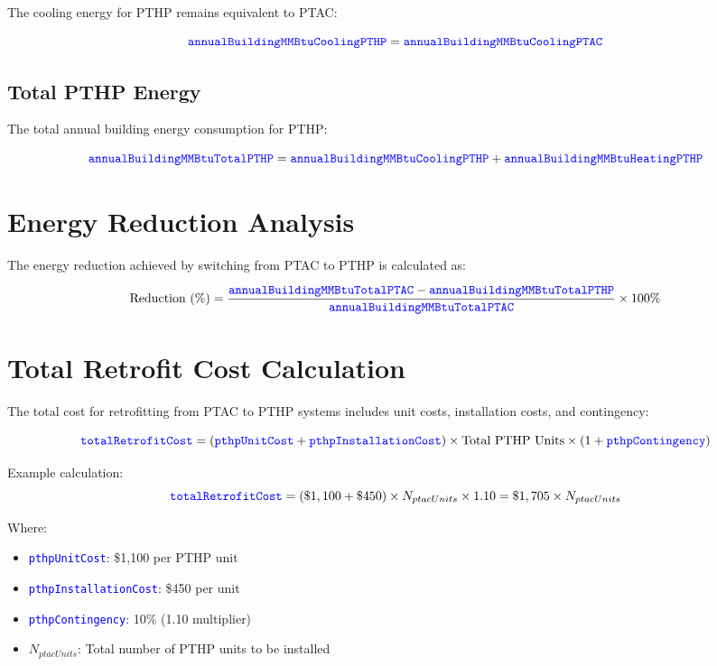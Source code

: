 \documentclass{article}
\newcommand{\code}[1]{\textcolor{blue}{\texttt{#1}}}
\begin{document}
The cooling energy for PTHP remains equivalent to PTAC:

\begin{equation}
\code{annualBuildingMMBtuCoolingPTHP} = \code{annualBuildingMMBtuCoolingPTAC}
\end{equation}

\subsection{Total PTHP Energy}

The total annual building energy consumption for PTHP:

\begin{equation}
\code{annualBuildingMMBtuTotalPTHP} = \code{annualBuildingMMBtuCoolingPTHP} + \code{annualBuildingMMBtuHeatingPTHP}
\end{equation}


\section{Energy Reduction Analysis}

The energy reduction achieved by switching from PTAC to PTHP is calculated as:

\begin{equation}
\text{Reduction (\%)} = \frac{\code{annualBuildingMMBtuTotalPTAC} - \code{annualBuildingMMBtuTotalPTHP}}{\code{annualBuildingMMBtuTotalPTAC}} \times 100\%
\end{equation}

\section{Total Retrofit Cost Calculation}

The total cost for retrofitting from PTAC to PTHP systems includes unit costs, installation costs, and contingency:

\begin{equation}
\code{totalRetrofitCost} = (\code{pthpUnitCost} + \code{pthpInstallationCost}) \times \text{Total PTHP Units} \times (1 + \code{pthpContingency})
\end{equation}

Example calculation:
\begin{equation}
\code{totalRetrofitCost} = (\$1,100 + \$450) \times N_{ptacUnits} \times 1.10 = \$1,705 \times N_{ptacUnits}
\end{equation}

Where:
\begin{itemize}
    \item \code{pthpUnitCost}: \$1,100 per PTHP unit
    \item \code{pthpInstallationCost}: \$450 per unit
    \item \code{pthpContingency}: 10\% (1.10 multiplier)
    \item $N_{ptacUnits}$: Total number of PTHP units to be installed
\end{itemize}
\end{document}
